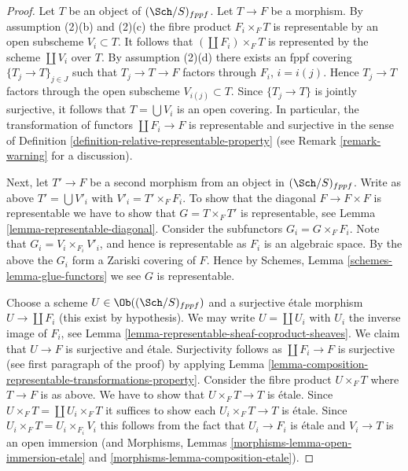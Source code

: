 \begin{proof}
Let $T$ be an object of $(\Sch/S)_{fppf}$. Let $T \to F$ be a morphism.
By assumption (2)(b) and (2)(c) the fibre product $F_i \times_F T$
is representable by an open subscheme $V_i \subset T$. It follows that
$(\coprod F_i) \times_F T$ is represented by the scheme $\coprod V_i$ over $T$.
By assumption (2)(d) there exists an fppf covering $\{T_j \to T\}_{j \in J}$
such that $T_j \to T \to F$ factors through $F_i$, $i = i(j)$.
Hence $T_j \to T$ factors through the open subscheme $V_{i(j)} \subset T$.
Since $\{T_j \to T\}$ is jointly surjective, it follows that
$T = \bigcup V_i$ is an open covering. In particular, the transformation
of functors $\coprod F_i \to F$ is representable
and surjective in the sense of
Definition \ref{definition-relative-representable-property}
(see Remark \ref{remark-warning} for a discussion).

\medskip\noindent
Next, let $T' \to F$ be a second morphism from an object in $(\Sch/S)_{fppf}$.
Write as above $T' = \bigcup V'_i$ with $V'_i = T' \times_F F_i$.
To show that the diagonal $F \to F \times F$ is representable
we have to show that $G = T \times_F T'$ is representable, see
Lemma \ref{lemma-representable-diagonal}.
Consider the subfunctors $G_i = G \times_F F_i$.
Note that $G_i = V_i \times_{F_i} V'_i$, and hence is representable
as $F_i$ is an algebraic space.
By the above the $G_i$ form a Zariski covering of $F$.
Hence by Schemes, Lemma \ref{schemes-lemma-glue-functors}
we see $G$ is representable.

\medskip\noindent
Choose a scheme $U \in \Ob((\Sch/S)_{fppf})$ and a surjective
\'etale morphism $U \to \coprod F_i$ (this exist by hypothesis).
We may write $U = \coprod U_i$ with $U_i$ the inverse image of $F_i$,
see Lemma \ref{lemma-representable-sheaf-coproduct-sheaves}.
We claim that $U \to F$ is surjective and \'etale. Surjectivity follows
as $\coprod F_i \to F$ is surjective (see first paragraph of the proof)
by applying
Lemma \ref{lemma-composition-representable-transformations-property}.
Consider the fibre product $U \times_F T$ where $T \to F$ is as
above. We have to show that $U \times_F T \to T$ is \'etale.
Since $U \times_F T = \coprod U_i \times_F T$ it suffices to show
each $U_i \times_F T \to T$ is \'etale. Since
$U_i \times_F T = U_i \times_{F_i} V_i$ this follows from the
fact that $U_i \to F_i$ is \'etale and $V_i \to T$ is an open immersion
(and Morphisms, Lemmas \ref{morphisms-lemma-open-immersion-etale}
and \ref{morphisms-lemma-composition-etale}).
\end{proof}














